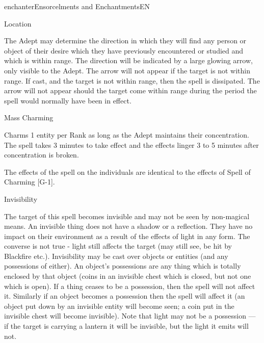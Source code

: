 \begin{college}[1.1]{enchanter}{Ensorcelments and Enchantments}{EN}
\begin{spell}[G-6]{Location}
\begin{effects}
The Adept may determine the direction in which they will find any
person or object of their desire which they have previously
encountered or studied and which is within range.  The direction will
be indicated by a large glowing arrow, only visible to the Adept. The
arrow will not appear if the target is not within range.  If cast, and
the target is not within range, then the spell is dissipated. The
arrow will not appear should the target come within range during the
period the spell would normally have been in effect.
\end{effects}
\end{spell}

\begin{spell}[G-7]{Mass Charming}

\begin{effects}
Charms 1 entity per Rank as long as the Adept maintains their
concentration. The spell takes 3 minutes to take effect and the
effects linger 3 to 5 minutes after concentration is broken.

The effects of the spell on the individuals are identical to the
effects of Spell of Charming [G-1].

\end{effects}
\end{spell}

\begin{spell}[G-8]{Invisibility}

\begin{effects}

The target of this spell becomes invisible and may not be seen by
non-magical means. An invisible thing does not have a shadow or a
reflection. They have no impact on their environment as a result of
the effects of light in any form. The converse is not true - light
still affects the target (\eg may still see, be hit by Blackfire
etc.). Invisibility may be cast over objects or entities (and any
possessions of either). An object's possessions are any thing which is
totally enclosed by that object (\eg coins in an invisible chest which
is closed, but not one which is open).  If a thing ceases to be a
possession, then the spell will not affect it. Similarly if an object
becomes a possession then the spell will affect it (\ie an object put
down by an invisible entity will become seen; a coin put in the
invisible chest will become invisible). Note that light may not be a
possession --- if the target is carrying a lantern it will be invisible,
but the light it emits will not.


\end{effects}
\end{spell}
\end{college}
